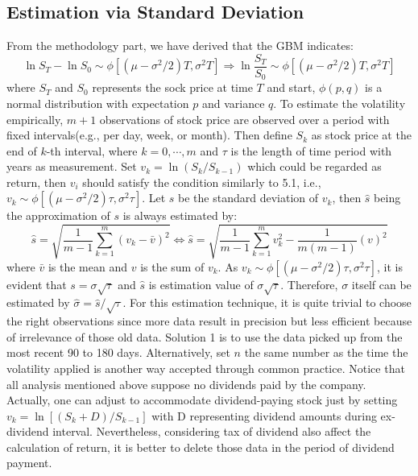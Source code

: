\subsection{Estimation via Standard Deviation}
From the methodology part, we have derived that the GBM indicates:
\begin{equation}
\ln{S_T}-\ln{S_0}\sim\phi[(\mu-\sigma^2/2)T,\sigma^2T]
\Rightarrow
\ln{\frac{S_T}{S_0}}\sim\phi[(\mu-\sigma^2/2)T,\sigma^2T]
\end{equation}
where $S_T$ and $S_0$ represents the sock price at time $T$ and start, $\phi(p,q)$ is a normal distribution with expectation $p$ and variance $q$. To estimate the volatility empirically, $m+1$ observations of stock price are observed over a period with fixed intervals(e.g., per day, week, or month). Then define $S_k$ as stock price at the end of $k$-th interval, where $k=0,\cdots,m$ and $\tau$ is the length of time period with years as measurement. Set $v_k=\ln{(S_k/S_{k-1})}$ which could be regarded as return, then $v_i$ should satisfy the condition similarly to 5.1, i.e., $v_k\sim\phi[(\mu-\sigma^2/2)\tau,\sigma^2\tau]$. Let $s$ be the standard deviation of $v_k$,  then $\hat{s}$ being the approximation of $s$ is always estimated by:
\begin{equation}\label{equation 5.2}
\hat{s}=\sqrt{\frac{1}{m-1}\sum_{k=1}^{m}(v_k-\bar{v})^2}
\Leftrightarrow
\hat{s}=\sqrt{\frac{1}{m-1}\sum_{k=1}^{m}v_k^2-\frac{1}{m(m-1)}(v)^2}
\end{equation}
where $\bar{v}$ is the mean and $v$ is the sum of $v_k$. As $v_k\sim\phi[(\mu-\sigma^2/2)\tau,\sigma^2\tau]$, it is evident that $s=\sigma\sqrt{\tau}$ and $\hat{s}$ is estimation value of $\sigma\sqrt{\tau}$. Therefore, $\sigma$ itself can be estimated by $\hat{\sigma}=\hat{s}/\sqrt{\tau}$. For this estimation technique, it is quite trivial to choose the right observations since more data result in precision but less efficient because of irrelevance of those old data. Solution 1 is to use the data picked up from the most recent 90 to 180 days. Alternatively, set $n$ the same number as the time the volatility applied is another way accepted through common practice. Notice that all analysis mentioned above suppose no dividends paid by the company. Actually, one can adjust to accommodate dividend-paying stock just by setting $v_k=\ln{[(S_k+D)/S_{k-1}]}$ with D representing dividend amounts during ex-dividend interval. Nevertheless, considering tax of dividend also affect the calculation of return, it is better to delete those data in the period of dividend payment. 
